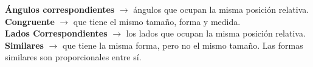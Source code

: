 \begin{defcard}
    \textbf{Ángulos correspondientes} $\rightarrow$ ángulos que ocupan la misma posición relativa.\\
    \textbf{Congruente} $\rightarrow$ que tiene el mismo tamaño, forma y medida.\\
    \textbf{Lados Correspondientes} $\rightarrow$ los lados que ocupan la misma posición relativa.\\
    \textbf{Similares} $\rightarrow$ que tiene la misma forma, pero no el mismo tamaño. Las formas similares son proporcionales entre sí.\\
\end{defcard}